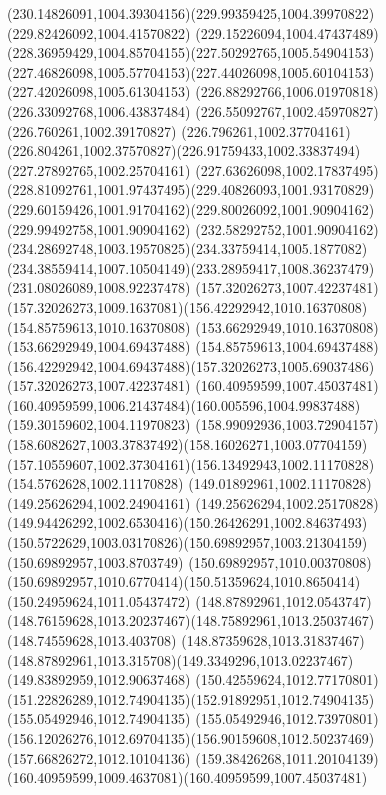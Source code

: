 {{		\curveto(230.14826091,1004.39304156)(229.99359425,1004.39970822)(229.82426092,1004.41570822)
		\curveto(229.15226094,1004.47437489)(228.36959429,1004.85704155)(227.50292765,1005.54904153)
		\curveto(227.46826098,1005.57704153)(227.44026098,1005.60104153)(227.42026098,1005.61304153)
		\lineto(226.88292766,1006.01970818)
		\lineto(226.33092768,1006.43837484)
		\lineto(226.55092767,1002.45970827)
		\lineto(226.760261,1002.39170827)
		\lineto(226.796261,1002.37704161)
		\curveto(226.804261,1002.37570827)(226.91759433,1002.33837494)(227.27892765,1002.25704161)
		\curveto(227.63626098,1002.17837495)(228.81092761,1001.97437495)(229.40826093,1001.93170829)
		\curveto(229.60159426,1001.91704162)(229.80026092,1001.90904162)(229.99492758,1001.90904162)
		\curveto(232.58292752,1001.90904162)(234.28692748,1003.19570825)(234.33759414,1005.1877082)
		\curveto(234.38559414,1007.10504149)(233.28959417,1008.36237479)(231.08026089,1008.92237478)
		\moveto(157.32026273,1007.42237481)
		\curveto(157.32026273,1009.1637081)(156.42292942,1010.16370808)(154.85759613,1010.16370808)
		\lineto(153.66292949,1010.16370808)
		\lineto(153.66292949,1004.69437488)
		\lineto(154.85759613,1004.69437488)
		\curveto(156.42292942,1004.69437488)(157.32026273,1005.69037486)(157.32026273,1007.42237481)
		\moveto(160.40959599,1007.45037481)
		\curveto(160.40959599,1006.21437484)(160.005596,1004.99837488)(159.30159602,1004.11970823)
		\curveto(158.99092936,1003.72904157)(158.6082627,1003.37837492)(158.16026271,1003.07704159)
		\curveto(157.10559607,1002.37304161)(156.13492943,1002.11170828)(154.5762628,1002.11170828)
		\lineto(149.01892961,1002.11170828)
		\lineto(149.25626294,1002.24904161)
		\curveto(149.25626294,1002.25170828)(149.94426292,1002.6530416)(150.26426291,1002.84637493)
		\curveto(150.5722629,1003.03170826)(150.69892957,1003.21304159)(150.69892957,1003.8703749)
		\lineto(150.69892957,1010.00370808)
		\curveto(150.69892957,1010.6770414)(150.51359624,1010.8650414)(150.24959624,1011.05437472)
		\curveto(148.87892961,1012.0543747)(148.76159628,1013.20237467)(148.75892961,1013.25037467)
		\lineto(148.74559628,1013.403708)
		\lineto(148.87359628,1013.31837467)
		\curveto(148.87892961,1013.315708)(149.3349296,1013.02237467)(149.83892959,1012.90637468)
		\curveto(150.42559624,1012.77170801)(151.22826289,1012.74904135)(152.91892951,1012.74904135)
		\lineto(155.05492946,1012.74904135)
		\lineto(155.05492946,1012.73970801)
		\curveto(156.12026276,1012.69704135)(156.90159608,1012.50237469)(157.66826272,1012.10104136)
		\curveto(159.38426268,1011.20104139)(160.40959599,1009.4637081)(160.40959599,1007.45037481)
}}
